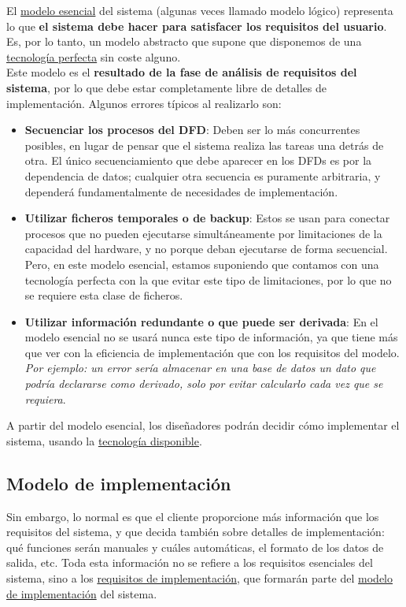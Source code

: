 El \uline{modelo esencial} del sistema (algunas veces llamado modelo lógico) representa lo que \textbf{el sistema debe hacer para satisfacer los requisitos del usuario}. Es, por lo tanto, un modelo abstracto que supone que disponemos de una \uline{tecnología perfecta} sin coste alguno.\\

Este modelo es el \textbf{resultado de la fase de análisis de requisitos del sistema}, por lo que debe estar completamente libre de detalles de implementación. Algunos errores típicos al realizarlo son:

\begin{itemize}
    \item \textbf{Secuenciar los procesos del DFD}: Deben ser lo más concurrentes posibles, en lugar de pensar que el sistema realiza las tareas una detrás de otra. El único secuenciamiento que debe aparecer en los DFDs es por la dependencia de datos; cualquier otra secuencia es puramente arbitraria, y dependerá fundamentalmente de necesidades de implementación.
    \item \textbf{Utilizar ficheros temporales o de backup}: Estos se usan para conectar procesos que no pueden ejecutarse simultáneamente por limitaciones de la capacidad del hardware, y no porque deban ejecutarse de forma secuencial. Pero, en este modelo esencial, estamos suponiendo que contamos con una tecnología perfecta con la que evitar este tipo de limitaciones, por lo que no se requiere esta clase de ficheros.
    \item \textbf{Utilizar información redundante o que puede ser derivada}: En el modelo esencial no se usará nunca este tipo de información, ya que tiene más que ver con la eficiencia de implementación que con los requisitos del modelo. \textit{Por ejemplo: un error sería almacenar en una base de datos un dato que podría declararse como derivado, solo por evitar calcularlo cada vez que se requiera}.
\end{itemize}

A partir del modelo esencial, los diseñadores podrán decidir cómo implementar el sistema, usando la \uline{tecnología disponible}.

\subsection{Modelo de implementación}

Sin embargo, lo normal es que el cliente proporcione más información que los requisitos del sistema, y que decida también sobre detalles de implementación: qué funciones serán manuales y cuáles automáticas, el formato de los datos de salida, etc. Toda esta información no se refiere a los requisitos esenciales del sistema, sino a los \uline{requisitos de implementación}, que formarán parte del \uline{modelo de implementación} del sistema.\\

